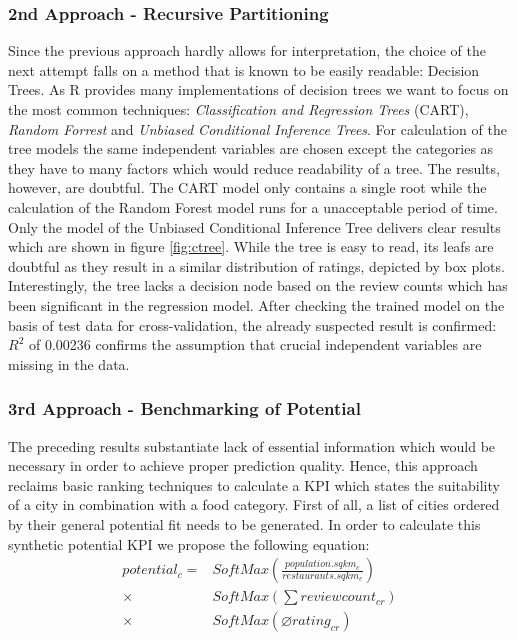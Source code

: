 \subsubsection{2nd Approach - Recursive Partitioning}
Since the previous approach hardly allows for interpretation, the choice of the next attempt falls on a method that is known to be easily readable: Decision Trees. As R provides many implementations of decision trees we want to focus on the most common techniques: \textit{Classification and Regression Trees} (CART), \textit{Random Forrest} and \textit{Unbiased Conditional Inference Trees}.\newline
For calculation of the tree models the same independent variables are chosen except the categories as they have to many factors which would reduce readability of a tree. The results, however, are doubtful. The CART model only contains a single root while the calculation of the Random Forest model runs for a unacceptable period of time. Only the model of the Unbiased Conditional Inference Tree delivers clear results which are shown in figure \ref{fig:ctree}.
While the tree is easy to read, its leafs are doubtful as they result in a similar distribution of ratings, depicted by box plots.
Interestingly, the tree lacks a decision node based on the review counts which has been significant in the regression model.
After checking the trained model on the basis of test data for cross-validation, the already suspected result is confirmed: $R^2$ of 0.00236 confirms the assumption that crucial independent variables are missing in the data.

\subsubsection{3rd Approach - Benchmarking of Potential}
The preceding results substantiate lack of essential information which would be necessary in order to achieve proper prediction quality. Hence, this approach reclaims basic ranking techniques to calculate a \ac{KPI} which states the suitability of a city in combination with a food category.\newline
First of all, a list of cities ordered by their general potential fit needs to be generated. In order to calculate this synthetic potential \ac{KPI}  we propose the following equation:
\begin{equation}
\begin{aligned}
	potential_c = &SoftMax(\frac{population.sqkm_c}{restaurants.sqkm_c})  \\
	\times & SoftMax(\textstyle \sum reviewcount_{cr})  \\
	\times & SoftMax(\varnothing rating_{cr}) %
\end{aligned}
\label{eq:potential_benchmark}
\end{equation}

